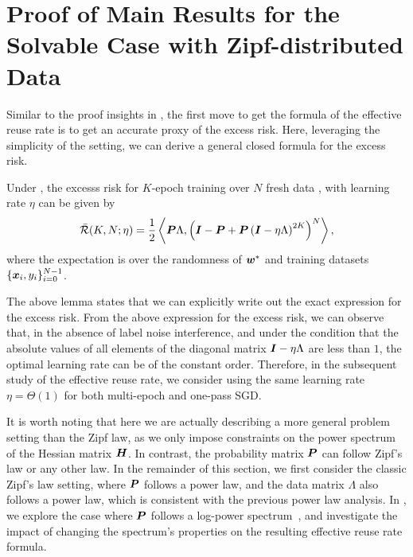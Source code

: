 \section{Proof of Main Results for the Solvable Case with Zipf-distributed Data}
Similar to the proof insights in , the first move to get the formula of the effective reuse rate is to get an accurate proxy of the excess risk. Here, leveraging the simplicity of the setting, we can derive a general closed formula for the excess risk.

\begin{lemma} \label{thm:one-hot-loss-estimate}
    Under , the excesss risk for $K$-epoch training over $N$ fresh data , with learning rate $\eta$ can be given by
    \begin{align*}
        \Bar{\mathcal{R}}(K,N;\eta) = \frac{1}{2}\left\langle {\bm{P}}\Lambda,\left({\bm{I}}-{\bm{P}}+{\bm{P}}\left({\bm{I}}-\eta\Lambda\right)^{2K}\right)^N\right\rangle,
    \end{align*}
    where the expectation is over the randomness of ${\bm{w}}^*$ and training datasets $\{{\bm{x}}_i,y_i\}_{i=0}^{N-1}$.
\end{lemma}
The above lemma states that we can explicitly write out the exact expression for the excess risk. From the above expression for the excess risk, we can observe that, in the absence of label noise interference, and under the condition that the absolute values of all elements of the diagonal matrix ${\bm{I}}-\eta\Lambda$ are less than $1$, the optimal learning rate can be of the constant order. Therefore, in the subsequent study of the effective reuse rate, we consider using the same learning rate $\eta = \Theta(1)$ for both multi-epoch and one-pass SGD.

It is worth noting that here we are actually describing a more general problem setting than the Zipf law, as we only impose constraints on the power spectrum of the Hessian matrix ${\bm{H}}$. In contrast, the probability matrix ${\bm{P}}$ can follow Zipf's law or any other law. In the remainder of this section, we first consider the classic Zipf's law setting, where ${\bm{P}}$ follows a power law, and the data matrix $\Lambda$ also follows a power law, which is consistent with the previous power law analysis. In , we explore the case where ${\bm{P}}$ follows a log-power spectrum~\citep{lin2024scaling}, and investigate the impact of changing the spectrum's properties on the resulting effective reuse rate formula.
